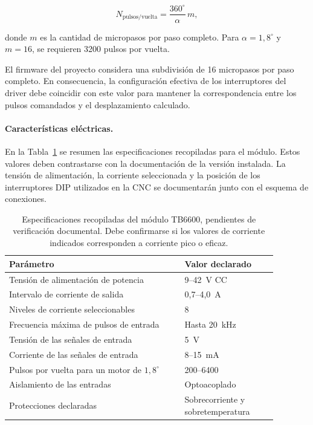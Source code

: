 \documentclass[blue,fullpaper]{ludusofficial}  %
\begin{document}
\begin{equation}
    N_{\mathrm{pulsos/vuelta}}
    = \frac{360^\circ}{\alpha}\,m,
\end{equation}

donde $m$ es la cantidad de micropasos por paso
completo. Para $\alpha=1{,}8^\circ$ y $m=16$,
se requieren 3200 pulsos por vuelta.

El firmware del proyecto considera una subdivisión
de 16 micropasos por paso completo. En consecuencia,
la configuración efectiva de los interruptores
del driver debe coincidir con este valor para
mantener la correspondencia entre los pulsos
comandados y el desplazamiento calculado.

\paragraph{Características eléctricas.}

En la Tabla~\ref{tab:tb6600} se resumen las
especificaciones recopiladas para el módulo.
Estos valores deben contrastarse con la documentación
de la versión instalada. La tensión de alimentación,
la corriente seleccionada y la posición de los
interruptores DIP utilizados en la CNC se
documentarán junto con el esquema de conexiones.

\begin{table}[htbp]
    \centering
    \begin{tabular}{p{0.58\linewidth}p{0.30\linewidth}}
        \hline
        Parámetro & Valor declarado \\
        \hline
        Tensión de alimentación de potencia
            & 9--42~V CC \\
        Intervalo de corriente de salida
            & 0,7--4,0~A \\
        Niveles de corriente seleccionables
            & 8 \\
        Frecuencia máxima de pulsos de entrada
            & Hasta 20~kHz \\
        Tensión de las señales de entrada
            & 5~V \\
        Corriente de las señales de entrada
            & 8--15~mA \\
        Pulsos por vuelta para un motor de $1{,}8^\circ$
            & 200--6400 \\
        Aislamiento de las entradas
            & Optoacoplado \\
        Protecciones declaradas
            & Sobrecorriente y sobretemperatura \\
        \hline
    \end{tabular}
    \caption{Especificaciones recopiladas del módulo
    TB6600, pendientes de verificación documental.
    Debe confirmarse si los valores de corriente
    indicados corresponden a corriente pico o eficaz.}
    \label{tab:tb6600}
\end{table}
\end{document}
